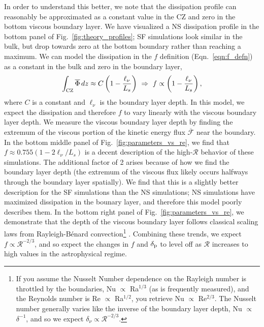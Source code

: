 \documentclass[twocolumn]{aastex631}
\newcommand{\delp}{\ensuremath{\delta_{\rm{p}}}}
\newcommand{\mR}{\ensuremath{\mathcal{R}}}
\renewcommand{\bar}[1]{\overline{#1}}
\begin{document}
In order to understand this better, we note that the dissipation profile can reasonably be approximated as a constant value in the CZ and zero in the bottom viscous boundary layer.
We have visualized a NS dissipation profile in the bottom panel of Fig.~\ref{fig:theory_profiles}; SF simulations look similar in the bulk, but drop towards zero at the bottom boundary rather than reaching a maximum.
We can model the dissipation in the $f$ definition (Eqn.~\ref{eqn:f_defn}) as a constant in the bulk and zero in the boundary layer,
\begin{equation}
\int_{\rm{CZ}} \bar{\Phi}\,dz \approx C \left( 1 - \frac{\ell_\nu}{L_s}\right)
\,\,\Rightarrow\,\,
f \propto \left(1 - \frac{\ell_\nu}{L_s}\right),
\end{equation}
where $C$ is a constant and $\ell_\nu$ is the boundary layer depth.
In this model, we expect the dissipation and therefore $f$ to vary linearly with the viscous boundary layer depth.
We measure the viscous boundary layer depth by finding the extremum of the viscous portion of the kinetic energy flux $\bar{\mathcal{F}}$ near the boundary.
In the bottom middle panel of Fig.~\ref{fig:parameters_vs_re}, we find that $f \approx 0.755(1 - 2\ell_\nu/L_s)$ is a decent description of the high-$\mR$ behavior of these simulations.
The additional factor of 2 arises because of how we find the boundary layer depth (the extremum of the viscous flux likely occurs halfways through the boundary layer spatially).
We find that this is a slightly better description for the SF simulations than the NS simulations; NS simulations have maximized dissipation in the bounary layer, and therefore this model poorly describes them.
In the bottom right panel of Fig.~\ref{fig:parameters_vs_re}, we demonstrate that the depth of the viscous boundary layer follows classical scaling laws from Rayleigh-B\'{e}nard convection\footnote{
If you assume the Nusselt Number dependence on the Rayleigh number is throttled by the boundaries, Nu $\propto$ Ra$^{1/3}$ (as is frequently measured), and the Reynolds number is Re $\propto$ Ra$^{1/2}$, you retrieve Nu $\propto$ Re$^{2/3}$. 
The Nusselt number generally varies like the inverse of the boundary layer depth, Nu $\propto$ $\delta^{-1}$, and so we expect $\delta_{\nu} \propto \mR^{-2/3}$.
} \citep{ahlers_etal_2009, goluskin2016}.
Combining these trends, we expect $f \propto \mR^{-2/3}$, and so expect the changes in $f$ and $\delp$ to level off as $\mR$ increases to high values in the astrophysical regime.
\end{document}
